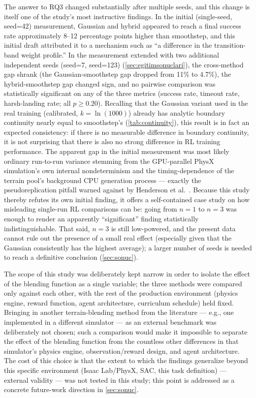 The answer to RQ3 changed substantially after multiple seeds, and this
change is itself one of the study's most instructive findings. In the
initial (single-seed, seed=42) measurement, Gaussian and hybrid appeared
to reach a final success rate approximately 8--12 percentage points
higher than smoothstep, and this initial draft attributed it to a
mechanism such as ``a difference in the transition-band weight
profile.'' In the measurement extended with two additional independent
seeds (seed=7, seed=123) (\cref{sec:egitimsonuclari}), the cross-method
gap shrank (the Gaussian-smoothstep gap dropped from 11\% to 4.7\%), the
hybrid-smoothstep gap changed sign, and no pairwise comparison was
statistically significant on any of the three metrics (success rate,
timeout rate, harsh-landing rate; all $p\ge 0.20$). Recalling that the
Gaussian variant used in the real training (calibrated, $k=\ln(1000)$)
already has analytic boundary continuity nearly equal to smoothstep's
(\cref{tab:continuity}), this result is in fact an expected consistency:
if there is no measurable difference in boundary continuity, it is not
surprising that there is also no strong difference in RL training
performance. The apparent gap in the initial measurement was most likely
ordinary run-to-run variance stemming from the GPU-parallel PhysX
simulation's own internal nondeterminism and the timing-dependence of
the terrain pool's background CPU generation process --- exactly the
pseudoreplication pitfall warned against by Henderson et al.\
\citep{henderson2018deep}. Because this study thereby refutes its own
initial finding, it offers a self-contained case study on how misleading
single-run RL comparisons can be: going from $n=1$ to $n=3$ was enough to
render an apparently ``significant'' finding statistically
indistinguishable. That said, $n=3$ is still low-powered, and the
present data cannot rule out the presence of a small real effect
(especially given that the Gaussian consistently has the highest
average); a larger number of seeds is needed to reach a definitive
conclusion (\cref{sec:sonuc}).

The scope of this study was deliberately kept narrow in order to isolate
the effect of the blending function as a single variable; the three
methods were compared only against each other, with the rest of the
production environment (physics engine, reward function, agent
architecture, curriculum schedule) held fixed. Bringing in another
terrain-blending method from the literature --- e.g., one implemented in
a different simulator --- as an external benchmark was deliberately not
chosen; such a comparison would make it impossible to separate the
effect of the blending function from the countless other differences in
that simulator's physics engine, observation/reward design, and agent
architecture. The cost of this choice is that the extent to which the
findings generalize beyond this specific environment (Isaac Lab/PhysX,
SAC, this task definition) --- external validity --- was not tested in
this study; this point is addressed as a concrete future-work direction
in \cref{sec:sonuc}.

